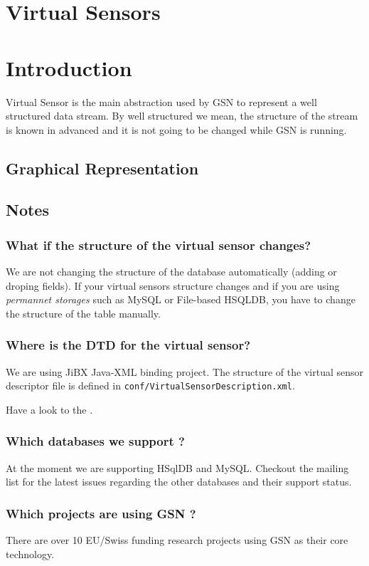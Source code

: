 \section{Virtual Sensors}
\section{Introduction}
Virtual Sensor is the main abstraction used by GSN to represent a well structured data stream.
By well structured we mean, the structure of the stream is known in advanced and it is not going to be changed
while GSN is running.
\subsection{Graphical Representation}

\subsection{Notes}

\subsubsection{What if the structure of the virtual sensor changes?}
We are not changing the structure of the database automatically (adding or droping fields). If your virtual sensors structure
changes and if you are using \emph{permannet storages} such as MySQL or File-based HSQLDB, you have to change the structure of the
table manually.

\subsubsection{Where is the DTD for the virtual sensor?}
We are using JiBX Java-XML binding project. The structure of the virtual sensor descriptor file is defined in \texttt{conf/VirtualSensorDescription.xml}.

Have a look to the .

\subsubsection{Which databases we support ?}
At the moment we are supporting HSqlDB and MySQL. Checkout the mailing list for the latest issues regarding the other databases and their
support status.
\subsubsection{Which projects are using GSN ?}
There are over 10 EU/Swiss funding research projects using GSN as their core technology.
